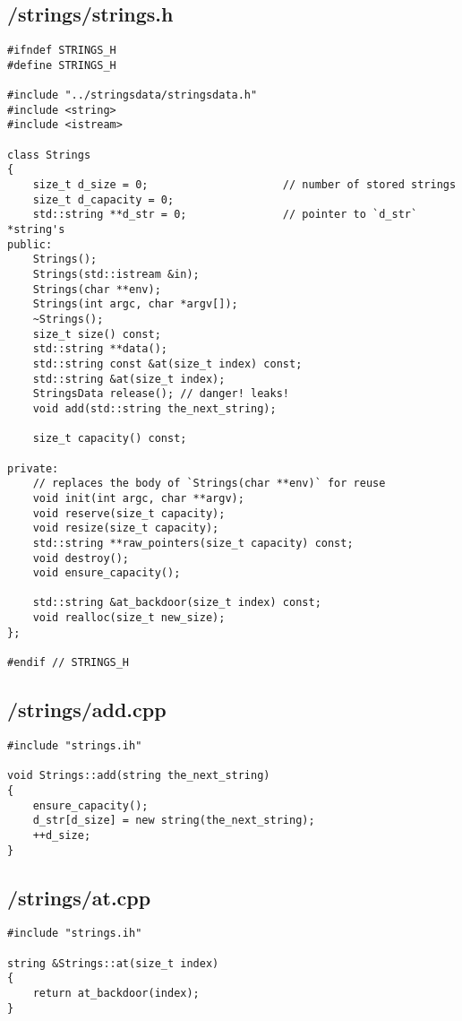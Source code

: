 \documentclass{article}
\begin{document}
\subsection*{/strings/strings.h}
\begin{verbatim}
#ifndef STRINGS_H
#define STRINGS_H

#include "../stringsdata/stringsdata.h"
#include <string>
#include <istream>

class Strings 
{
    size_t d_size = 0;                     // number of stored strings
    size_t d_capacity = 0;
    std::string **d_str = 0;               // pointer to `d_str` *string's
public:
    Strings();
    Strings(std::istream &in);
    Strings(char **env);
    Strings(int argc, char *argv[]);
    ~Strings();
    size_t size() const;
    std::string **data();
    std::string const &at(size_t index) const;
    std::string &at(size_t index);
    StringsData release(); // danger! leaks!
    void add(std::string the_next_string);

    size_t capacity() const;

private:
    // replaces the body of `Strings(char **env)` for reuse
    void init(int argc, char **argv);
    void reserve(size_t capacity);
    void resize(size_t capacity);
    std::string **raw_pointers(size_t capacity) const;
    void destroy();
    void ensure_capacity();

    std::string &at_backdoor(size_t index) const;
    void realloc(size_t new_size);
};

#endif // STRINGS_H

\end{verbatim}
\subsection*{/strings/add.cpp}
\begin{verbatim}
#include "strings.ih"

void Strings::add(string the_next_string)
{
    ensure_capacity();
    d_str[d_size] = new string(the_next_string);
    ++d_size;
}
\end{verbatim}
\subsection*{/strings/at.cpp}
\begin{verbatim}
#include "strings.ih"

string &Strings::at(size_t index)
{
    return at_backdoor(index);
}
\end{verbatim}
\end{document}
